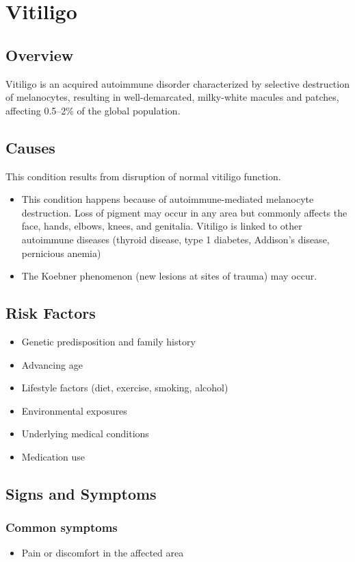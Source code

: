 \chapter{Vitiligo}
\label{sec:Vitiligo}

\section{Overview}
Vitiligo is an acquired autoimmune disorder characterized by selective destruction of melanocytes, resulting in well-demarcated, milky-white macules and patches, affecting 0.5--2\% of the global population.
\section{Causes}
This condition results from disruption of normal vitiligo function.

\begin{itemize}[noitemsep]
  \item This condition happens because of autoimmune-mediated melanocyte destruction. Loss of pigment may occur in any area but commonly affects the face, hands, elbows, knees, and genitalia. Vitiligo is linked to other autoimmune diseases (thyroid disease, type 1 diabetes, Addison's disease, pernicious anemia)
  \item The Koebner phenomenon (new lesions at sites of trauma) may occur.
\end{itemize}
\section{Risk Factors}


\begin{itemize}[noitemsep]
  \item Genetic predisposition and family history
  \item Advancing age
  \item Lifestyle factors (diet, exercise, smoking, alcohol)
  \item Environmental exposures
  \item Underlying medical conditions
  \item Medication use
\end{itemize}
\section{Signs and Symptoms}

\subsection{Common symptoms}
\begin{itemize}[noitemsep]
  \item Pain or discomfort in the affected area
  \end{itemize}

